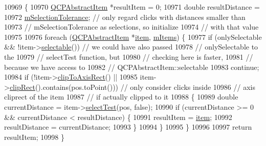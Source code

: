 \begin{DoxyCode}
10969                                                                 \{
10970   \hyperlink{class_q_c_p_abstract_item}{QCPAbstractItem} *resultItem = 0;
10971   \textcolor{keywordtype}{double} resultDistance =
10972       \hyperlink{class_q_custom_plot_abc36e12dd0482117ad810a800c847722}{mSelectionTolerance}; \textcolor{comment}{// only regard clicks with distances smaller than}
10973                            \textcolor{comment}{// mSelectionTolerance as selections, so initialize}
10974                            \textcolor{comment}{// with that value}
10975 
10976   \textcolor{keywordflow}{foreach} (\hyperlink{class_q_c_p_abstract_item}{QCPAbstractItem} *\hyperlink{class_q_custom_plot_a700399eae539798c5baf64a37c7f2135}{item}, \hyperlink{class_q_custom_plot_afa5fd6957169dfef2e4e7815a04c36e0}{mItems}) \{
10977     \textcolor{keywordflow}{if} (onlySelectable && !item->\hyperlink{class_q_c_p_abstract_item_a9189e752025533e1595eaade0009a3bc}{selectable}()) \textcolor{comment}{// we could have also passed}
10978                                                \textcolor{comment}{// onlySelectable to the}
10979                                                \textcolor{comment}{// selectTest function, but}
10980                                                \textcolor{comment}{// checking here is faster,}
10981                                                \textcolor{comment}{// because we have access to}
10982                                                \textcolor{comment}{// QCPAbstractItem::selectable}
10983       \textcolor{keywordflow}{continue};
10984     \textcolor{keywordflow}{if} (!item->\hyperlink{class_q_c_p_abstract_item_a5b0ea171823033bcb8aee81f4a034871}{clipToAxisRect}() ||
10985         item->\hyperlink{class_q_c_p_abstract_item_a538e25ff8856534582f5b2b400a46405}{clipRect}().contains(pos.toPoint())) \textcolor{comment}{// only consider clicks inside}
10986                                                   \textcolor{comment}{// axis cliprect of the item}
10987                                                   \textcolor{comment}{// if actually clipped to it}
10988     \{
10989       \textcolor{keywordtype}{double} currentDistance = item->\hyperlink{class_q_c_p_abstract_item_a96d522d10ffc0413b9a366c6f7f0476b}{selectTest}(pos, \textcolor{keyword}{false});
10990       \textcolor{keywordflow}{if} (currentDistance >= 0 && currentDistance < resultDistance) \{
10991         resultItem = \hyperlink{class_q_custom_plot_a700399eae539798c5baf64a37c7f2135}{item};
10992         resultDistance = currentDistance;
10993       \}
10994     \}
10995   \}
10996 
10997   \textcolor{keywordflow}{return} resultItem;
10998 \}
\end{DoxyCode}


